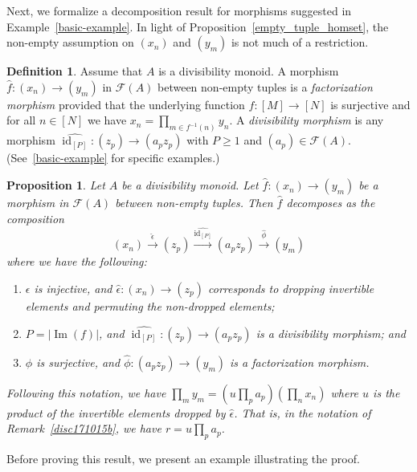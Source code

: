 \documentclass[reqno]{amsart}
\theoremstyle{plain}
\newtheorem{prop}[lem]{Proposition}
\theoremstyle{definition}
\newtheorem{defn}[lem]{Definition}
\newcommand{\cat}[1]{\mathcal{#1}}
\newcommand{\catf}{\cat{F}}
\newcommand{\id}{\operatorname{id}}
\newcommand{\im}{\operatorname{Im}}
\newcommand{\xra}{\xrightarrow}
\renewcommand{\geq}{\geqslant}
\numberwithin{equation}{lem}
\begin{document}
Next, we formalize a decomposition result for morphisms suggested in Example~\ref{basic-example}.
In light of Proposition~\ref{empty_tuple_homset}, the non-empty assumption on $(x_n)$ and $(y_m)$
is not much of a restriction.

\begin{defn}\label{defn170715b}
Assume that $A$ is a divisibility monoid.
A morphism $\hat f\colon(x_n)\to (y_m)$  in $\catf(A)$ between non-empty tuples
is a \emph{factorization morphism} provided that the underlying function $f\colon[M]\to[N]$ is surjective
and for all $n\in [N]$ we have $x_n=\prod_{m\in f^{-1}(n)}y_n$.
A \emph{divisibility morphism} is any morphism $\widehat{\id_{[P]}}\colon (z_p)\to (a_pz_p)$ with $P\geq 1$ and $(a_p)\in\catf(A)$.
(See~\ref{basic-example} for specific examples.)
\end{defn}

\begin{prop}\label{prop170423a}
Let $A$ be a divisibility monoid.
Let $\hat f\colon(x_n)\to (y_m)$ be a morphism in $\catf(A)$ between non-empty tuples.
Then $\hat f$ decomposes as the composition 
$$(x_n)\xra{\hat\epsilon}(z_p)\xra{\widehat{\id_{[P]}}}(a_pz_p)
\xra{\hat\phi}(y_m)$$
where we have the following:
\begin{enumerate}[\rm(1)]
\item $\epsilon$ is injective, 
and 
$\hat\epsilon\colon(x_n)\to(z_p)$
corresponds to dropping invertible elements and permuting the non-dropped elements;
\item $P=|\im(f)|$, and $\widehat{\id_{[P]}}\colon(z_p)\to(a_pz_p)$ is a divisibility morphism; and
\item $\phi$ is surjective, and $\hat\phi\colon(a_pz_p)\to(y_m)$ is a factorization morphism.
\end{enumerate}
Following this notation, we have $\prod_my_m=\left(u\prod_pa_p\right)\left(\prod_nx_n\right)$ where $u$ is the product of the
invertible elements dropped by $\hat\epsilon$.
That is, in the notation of Remark~\ref{disc171015b}, we have $r=u\prod_pa_p$.
\end{prop}

Before proving this result, we present an example illustrating the proof.
\end{document}
